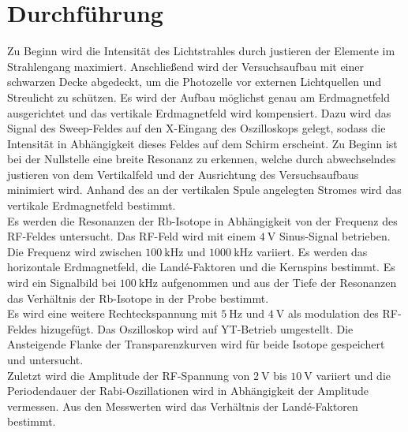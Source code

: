 \section{Durchführung}
\label{sec:Durchführung}

Zu Beginn wird die Intensität des Lichtstrahles durch justieren der Elemente im Strahlengang maximiert. Anschließend wird der Versuchsaufbau mit einer schwarzen Decke abgedeckt, um die Photozelle vor externen Lichtquellen und Streulicht zu schützen.
Es wird der Aufbau möglichst genau am Erdmagnetfeld ausgerichtet und das vertikale Erdmagnetfeld wird kompensiert. Dazu wird das Signal des Sweep-Feldes auf den X-Eingang des Oszilloskops gelegt, sodass die Intensität in Abhängigkeit dieses Feldes auf dem Schirm erscheint. Zu Beginn ist bei der Nullstelle eine breite Resonanz zu erkennen, welche durch abwechselndes justieren von dem Vertikalfeld und der Ausrichtung des Versuchsaufbaus minimiert wird. Anhand des an der vertikalen Spule angelegten Stromes wird das vertikale Erdmagnetfeld bestimmt.\\
Es werden die Resonanzen der Rb-Isotope in Abhängigkeit von der Frequenz des RF-Feldes untersucht. Das RF-Feld wird mit einem $\SI{4}{\volt}$ Sinus-Signal betrieben. Die Frequenz wird zwischen $\SI{100}{\kilo\hertz}$ und $\SI{1000}{\kilo\hertz}$ variiert. Es werden das horizontale Erdmagnetfeld, die Landé-Faktoren und die Kernspins bestimmt.
Es wird ein Signalbild bei $\SI{100}{\kilo\hertz}$ aufgenommen und aus der Tiefe der Resonanzen das Verhältnis der Rb-Isotope in der Probe bestimmt.\\
Es wird eine weitere Rechteckspannung mit $\SI{5}{\hertz}$ und $\SI{4}{\volt}$ als modulation des RF-Feldes hizugefügt. Das Oszilloskop wird auf YT-Betrieb umgestellt. Die Ansteigende Flanke der Transparenzkurven wird für beide Isotope gespeichert und untersucht.\\
Zuletzt wird die Amplitude der RF-Spannung von $\SI{2}{\volt}$ bis $\SI{10}{\volt}$ variiert und die Periodendauer der Rabi-Oszillationen wird in Abhängigkeit der Amplitude vermessen. Aus den Messwerten wird das Verhältnis der Landé-Faktoren bestimmt. 